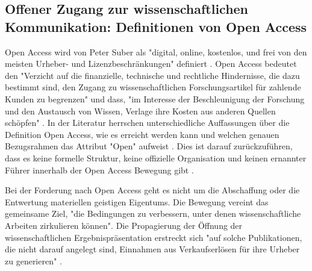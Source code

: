 \subsection{Offener Zugang zur wissenschaftlichen Kommunikation: Definitionen von Open Access}

Open Access wird von Peter Suber als "digital, online, kostenlos, und frei von den meisten Urheber- und Lizenzbeschränkungen" \cite{suber_2012_open} definiert \cite{Adema_2014_open_access}. Open Access bedeutet den "Verzicht auf die finanzielle, technische und rechtliche Hindernisse, die dazu bestimmt sind, den Zugang zu wissenschaftlichen Forschungsartikel für zahlende Kunden zu begrenzen" und dass, "im Interesse der Beschleunigung der Forschung und den Austausch von Wissen, Verlage ihre Kosten aus anderen Quellen schöpfen" \cite{Suber_2002}. In der Literatur herrschen unterschiedliche Auffassungen über die Definition Open Access, wie es erreicht werden kann und welchen genauen Bezugsrahmen das Attribut "Open" aufweist \cite{Adema_2014_open_access}. Dies ist darauf zurückzuführen, dass es keine formelle Struktur, keine offizielle Organisation und keinen ernannter Führer innerhalb der Open Access Bewegung gibt \cite{poynder_2011_suber}.

Bei der Forderung nach Open Access geht es nicht um die Abschaffung oder die Entwertung materiellen geistigen Eigentums. Die Bewegung vereint das gemeinsame Ziel, "die Bedingungen zu verbessern, unter denen wissenschaftliche Arbeiten zirkulieren können"\cite{Adema_2014_open_access}. Die Propagierung der Öffnung der wissenschaftlichen Ergebnispräsentation erstreckt sich "auf solche Publikationen, die nicht darauf angelegt sind, Einnahmen aus Verkaufserlösen für ihre Urheber zu generieren" \cite{muller_2010_open}.

